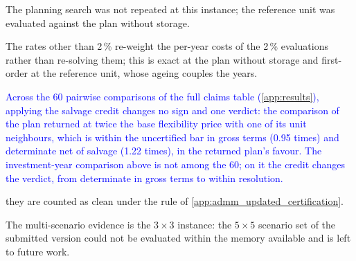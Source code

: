     The planning search was not repeated at this instance; the reference unit was evaluated against the plan without storage.

    The rates other than 2\,\% re-weight the per-year costs of the 2\,\% evaluations rather than re-solving them; this is exact at the plan without storage and first-order at the reference unit, whose ageing couples the years.

\textcolor{blue}{
    Across the 60 pairwise comparisons of the full claims table (\ref{app:results}), applying the salvage credit changes no sign and one verdict: the comparison of the plan returned at twice the base flexibility price with one of its unit neighbours, which is within the uncertified bar in gross terms (0.95 times) and determinate net of salvage (1.22 times), in the returned plan's favour. The investment-year comparison above is not among the 60; on it the credit changes the verdict, from determinate in gross terms to within resolution.
}

    they are counted as clean under the rule of \ref{app:admm_updated_certification}.

    The multi-scenario evidence is the $3 \times 3$ instance: the $5 \times 5$ scenario set of the submitted version could not be evaluated within the memory available and is left to future work.

